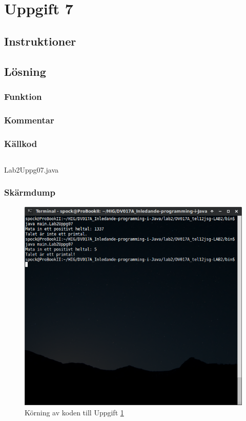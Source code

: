 \section{Uppgift 7}\label{sec:uppg07}

\subsection{Instruktioner}


\subsection{Lösning}
\subsubsection{Funktion}

\subsubsection{Kommentar}


\subsubsection{Källkod}
\inputminted[linenos]{java}{src/Lab2Uppg07.java}
\caption{Lab2Uppg07.java}
\label{src:uppg07}


\subsubsection{Skärmdump}
\begin{figure}[htbp]
    \centering
        \includegraphics[width=\linewidth]{img/07.png}
    \caption{Körning av koden till Uppgift \ref{sec:uppg07}}
    \label{fig:uppg07-screenshot}
\end{figure}

